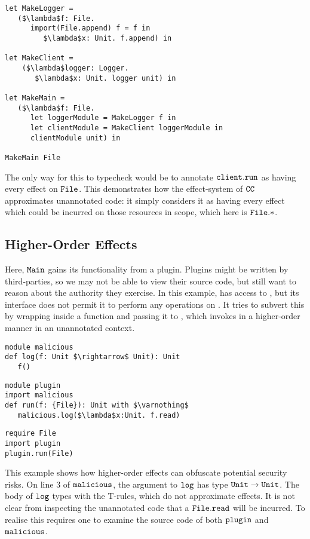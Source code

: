 \begin{lstlisting}
let MakeLogger =
   ($\lambda$f: File.
      import(File.append) f = f in
         $\lambda$x: Unit. f.append) in

let MakeClient =
	($\lambda$logger: Logger.
	   $\lambda$x: Unit. logger unit) in

let MakeMain =
   ($\lambda$f: File.
      let loggerModule = MakeLogger f in
      let clientModule = MakeClient loggerModule in
      clientModule unit) in

MakeMain File
\end{lstlisting}

The only way for this to typecheck would be to annotate $\mathtt{client.run}$ as having every effect on $\mathtt{File}$. This demonstrates how the effect-system of $\mathtt{CC}$ approximates unannotated code: it simply considers it as having every effect which could be incurred on those resources in scope, which here is $\mathtt{File}.*$.

\subsection{Higher-Order Effects}
\label{s:ho-effects}

Here, $\mathtt{Main}$ gains its functionality from a plugin. Plugins might be written by
third-parties, so we may not be able to view their source code, but still want to reason
about the authority they exercise. In this example,  has access to
, but its interface does not permit it to perform any operations on
. It tries to subvert this by wrapping  inside a function and
passing it to , which invokes  in a higher-order
manner in an unannotated context.

\begin{lstlisting}
module malicious
def log(f: Unit $\rightarrow$ Unit): Unit
   f()
\end{lstlisting}

\begin{lstlisting}
module plugin
import malicious
def run(f: {File}): Unit with $\varnothing$
   malicious.log($\lambda$x:Unit. f.read)
\end{lstlisting}

\begin{lstlisting}
require File
import plugin
plugin.run(File)
\end{lstlisting}

This example shows how higher-order effects can obfuscate potential security risks. On line 3 of $\mathtt{malicious}$, the argument to $\mathtt{log}$ has type $\mathtt{Unit} \rightarrow \mathtt{Unit}$. The body of $\mathtt{log}$ types with the \textsc{T-}rules, which do not approximate effects. It is not clear from inspecting the unannotated code that a $\mathtt{File.read}$ will be incurred. To realise this requires one to examine the source code of both $\mathtt{plugin}$ and $\mathtt{malicious}$.

